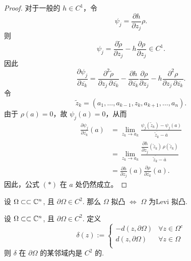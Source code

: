 \begin{proof}
对于一般的 \(h\in C^1\)，令
\[
\psi_j
=
\frac{\partial h}{\partial z_j}\rho.
\]
则
\[
\psi_j
=
\frac{\partial\widetilde{\rho}}{\partial z_j}
-
h\frac{\partial\rho}{\partial z_j}
\in C^1.
\]
因此
\[
\frac{\partial\psi_j}{\partial\overline{z_k}}
=
\frac{\partial^2\widetilde{\rho}}
     {\partial z_j\,\partial\overline{z_k}}
-
\frac{\partial h}{\partial\overline{z_k}}
\frac{\partial\rho}{\partial z_j}
-
h\frac{\partial^2\rho}
       {\partial z_j\,\partial\overline{z_k}}.
\]
令
\[
\widetilde{z}_k
=
(a_1,\ldots,a_{k-1},z_k,a_{k+1},\ldots,a_n).
\]
由于 \(\rho(a)=0\)，故 \(\psi_j(a)=0\)，从而
\[
\begin{aligned}
\frac{\partial\psi_j}{\partial\overline{z_k}}(a)
&=
\lim_{z_k\to a_k}
\frac{\psi_j(\widetilde{z}_k)-\psi_j(a)}
     {\overline{\tilde{z}_k}-\overline{a}}  \\
&=
\lim_{z_k\to a_k}
\frac{
\dfrac{\partial h}{\partial z_j}(\widetilde{z}_k)
\,\rho(\widetilde{z}_k)
}{
\overline{\tilde{z}_k}-\overline{a}
} \\
&=
\frac{\partial h}{\partial z_j}(a)
\frac{\partial\rho}{\partial\overline{z_k}}(a).
\end{aligned}
\]
因此，公式 \((*)\) 在 \(a\) 处仍然成立。
\end{proof}

\begin{theorem}\label{thm3.2}
    设 $\Omega \subset \subset {\mathbb C}^n$, 且 $\partial \Omega \in C^2$. 那么 $\Omega $ 拟凸 $\iff $ $\Omega $ 为Levi 拟凸.     
\end{theorem}

\begin{lemma}\label{lem3.2}
    设 $\Omega \subset \subset {\mathbb C}^n$, 且 $\partial \Omega \in C^2$. 
    定义 
    $$ \delta (z):= \begin{cases}
        -d(z,\partial \Omega ) &\text{} \forall z \in \Omega ^c \\
       d(z, \partial \Omega )  &\text{} \forall z \in \Omega \\
    \end{cases}  $$
    则 $\delta $ 在 $\partial \Omega $  的某邻域内是 $C^2$  的. 
\end{lemma}

